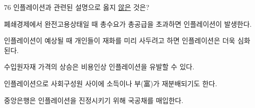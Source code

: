 \begin{question}{76}
인플레이션과 관련된 설명으로 옳지 \uline{않은} 것은?
\begin{choices}
  \item 폐쇄경제에서 완전고용상태일 때 총수요가 총공급을 초과하면 인플레이션이 발생한다.
  \item 인플레이션이 예상될 때 개인들이 재화를 미리 사두려고 하면 인플레이션은 더욱 심화된다.
  \item 수입원자재 가격의 상승은 비용인상 인플레이션을 유발할 수 있다.
  \item 인플레이션으로 사회구성원 사이에 소득이나 부(富)가 재분배되기도 한다.
  \item 중앙은행은 인플레이션을 진정시키기 위해 국공채를 매입한다.
\end{choices}
\end{question}
